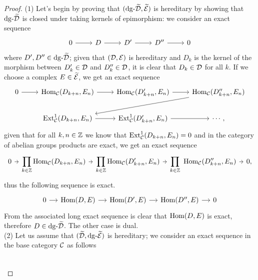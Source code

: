 \begin{proof}
    ($1$) Let's begin by proving that $(\mathrm{dg} \text{-}\widetilde{\mathcal{D}}, \widetilde{\mathcal{E}})$ is hereditary by showing that $\mathrm{dg} \text{-}\widetilde{\mathcal{D}}$ is closed under taking kernels of epimorphism: we consider an exact sequence 
    \[\begin{tikzcd}
        0 & {D} & {D'} & {D''} & 0
        \arrow[from=1-1, to=1-2]
        \arrow[from=1-2, to=1-3]
        \arrow[from=1-3, to=1-4]
        \arrow[from=1-4, to=1-5]
    \end{tikzcd}\]
    where $D', D'' \in \mathrm{dg} \text{-}\widetilde{\mathcal{D}}$; given that $(\mathcal{D}, \mathcal{E})$ is hereditary and $D_k$ is the kernel of the morphism between $D'_k\in \mathcal{D} $ and $D''_k \in \mathcal{D}$, it is clear that $D_k \in \mathcal{D}$ for all $k$. If we choose a complex $E \in \widetilde{\mathcal{E}}$, we get an exact sequence
    \[\begin{tikzcd}
        0 & {\Hom_\C(D_{k+n},E_n)} & {\Hom_\C(D'_{k+n},E_n)} & {\Hom_\C(D''_{k+n},E_n)} \\
        & {\Ext^1_\C(D_{k+n},E_n)} & {\Ext^1_\C(D'_{k+n},E_n)} & {\cdots,}
        \arrow[from=1-1, to=1-2]
        \arrow[from=1-2, to=1-3]
        \arrow[from=1-3, to=1-4]
        \arrow[from=1-4, to=2-2]
        \arrow[from=2-2, to=2-3]
        \arrow[from=2-3, to=2-4]
    \end{tikzcd}\]
    given that for all $k,n \in \mathbb{Z}$ we know that $\mathrm{Ext}^1_{\mathcal{C}}(D_{k+n},E_n)= 0$ and in the category of abelian groups products are exact, we get an exact sequence 
    \[\begin{tikzcd}[sep=tiny]
        0 & {\displaystyle \prod _{k \in \Z}\Hom_\C(D_{k+n},E_n)} & {\displaystyle \prod _{k \in \Z}\Hom_\C(D'_{k+n},E_n)} & {\displaystyle \prod _{k \in \Z}\ \Hom_\C(D''_{k+n},E_n)} & {0,}
        \arrow[from=1-1, to=1-2]
        \arrow[from=1-2, to=1-3]
        \arrow[from=1-3, to=1-4]
        \arrow[from=1-4, to=1-5]
    \end{tikzcd}\]
    thus the following sequence is exact.
    \[\begin{tikzcd}[sep=small]
        0 & {\Hom(D,E)} & {\Hom(D',E)} & {\Hom(D'',E)} & 0
        \arrow[from=1-1, to=1-2]
        \arrow[from=1-2, to=1-3]
        \arrow[from=1-3, to=1-4]
        \arrow[from=1-4, to=1-5]
    \end{tikzcd}\]
    From the associated long exact sequence is clear that $\mathrm{Hom}(D,E)$ is exact, therefore $D \in \mathrm{dg} \text{-}\widetilde{\mathcal{D}}$. The other case is dual. \\ 
    (2) Let us assume that $(\widetilde{\mathcal{D}}, \mathrm{dg} \text{-}\widetilde{\mathcal{E}})$ is hereditary; we consider an exact sequence in the base category $\mathcal{C}$ as follows
    \[\begin{tikzcd}

\end{tikzcd}\]
\end{proof}
